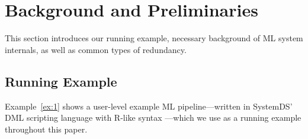 \section{Background and Preliminaries}
\label{sec:bg}

This section introduces our running example, necessary background of ML system internals, as well as common types of redundancy.

\subsection{Running Example}

Example~\ref{ex:1} shows a user-level example ML pipeline---written in SystemDS' DML scripting language with R-like syntax \cite{BoehmADGIKLPR20}---which we use as a running example throughout this paper.

